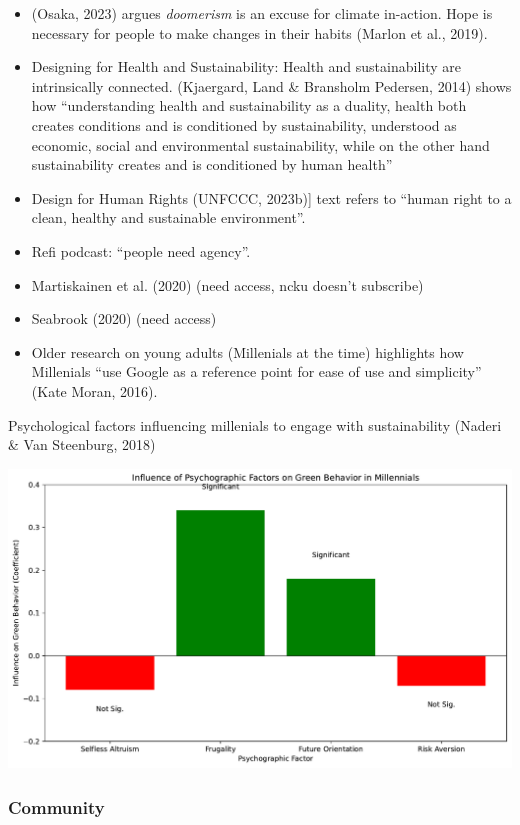\documentclass[
  letterpaper,
  DIV=11,
  numbers=noendperiod]{scrartcl}
\begin{document}
\begin{itemize}
\item
  (Osaka, 2023) argues \emph{doomerism} is an excuse for climate
  in-action. Hope is necessary for people to make changes in their
  habits (Marlon et al., 2019).
\item
  Designing for Health and Sustainability: Health and sustainability are
  intrinsically connected. (Kjaergard, Land \& Bransholm Pedersen, 2014)
  shows how ``understanding health and sustainability as a duality,
  health both creates conditions and is conditioned by sustainability,
  understood as economic, social and environmental sustainability, while
  on the other hand sustainability creates and is conditioned by human
  health''
\item
  Design for Human Rights (UNFCCC, 2023b){]} text refers to ``human
  right to a clean, healthy and sustainable environment''.
\item
  Refi podcast: ``people need agency''.
\item
  Martiskainen et al. (2020) (need access, ncku doesn't subscribe)
\item
  Seabrook (2020) (need access)
\item
  Older research on young adults (Millenials at the time) highlights how
  Millenials ``use Google as a reference point for ease of use and
  simplicity'' (Kate Moran, 2016).
\end{itemize}

Psychological factors influencing millenials to engage with
sustainability (Naderi \& Van Steenburg, 2018)

\includegraphics{_thesis_files/figure-pdf/cell-13-output-1.pdf}

\subsubsection{Community}\label{community}
\end{document}
